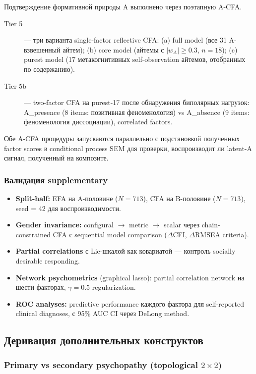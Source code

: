 Подтверждение формативной природы A выполнено через поэтапную A-CFA.
\begin{description}
    \item[Tier 5] --- три варианта single-factor reflective CFA: (a) full model (все 31 A-взвешенный айтем); (b) core model (айтемы с $|w_A| \geq 0.3$, $n = 18$); (c) purest model (17 метакогнитивных self-observation айтемов, отобранных по содержанию).
    \item[Tier 5b] --- two-factor CFA на purest-17 после обнаружения биполярных нагрузок: A\_presence (8 items: позитивная феноменология) vs A\_absence (9 items: феноменология диссоциации), correlated factors.
\end{description}
Обе A-CFA процедуры запускаются параллельно с подстановкой полученных factor scores в conditional process SEM для проверки, воспроизводит ли latent-A сигнал, полученный на композите.

\subsubsection{Валидация supplementary}

\begin{itemize}
    \item \textbf{Split-half:} EFA на A-половине ($N = 713$), CFA на B-половине ($N = 713$), seed = 42 для воспроизводимости.
    \item \textbf{Gender invariance:} configural $\to$ metric $\to$ scalar через chain-constrained CFA с sequential model comparison ($\Delta$CFI, $\Delta$RMSEA criteria).
    \item \textbf{Partial correlations} с Lie-шкалой как ковариатой --- контроль socially desirable responding.
    \item \textbf{Network psychometrics} (graphical lasso): partial correlation network на шести факторах, $\gamma = 0.5$ regularization.
    \item \textbf{ROC analyses:} predictive performance каждого фактора для self-reported clinical diagnoses, с 95\% AUC CI через DeLong method.
\end{itemize}

\subsection{Деривация дополнительных конструктов}

\subsubsection{\texorpdfstring{Primary vs secondary psychopathy (topological $2\times 2$)}{Primary vs secondary psychopathy (topological 2x2)}}

